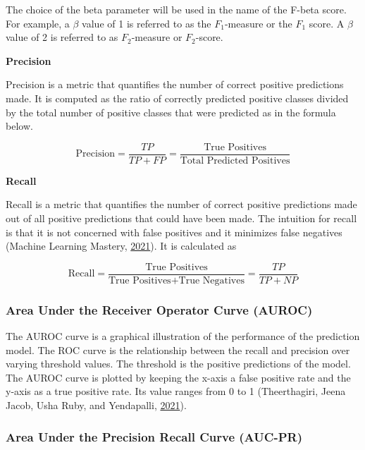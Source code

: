\documentclass[
  10pt,
]{article}
\begin{document}
The choice of the beta parameter will be used in the name of the F-beta score. For example, a \(\beta\) value of 1 is referred to as the \(F_1\)-measure or the \(F_1\) score. A \(\beta\) value of 2 is referred to as \(F_2\)-measure or \(F_2\)-score.

\textbf{Precision}

Precision is a metric that quantifies the number of correct positive predictions made. It is computed as the ratio of correctly predicted positive classes divided by the total number of positive classes that were predicted as in the formula below.

\[
\text{Precision} = \frac{TP}{TP + FP} = \frac{\text{True Positives}}{\text{Total Predicted Positives}}
\]

\textbf{Recall}

Recall is a metric that quantifies the number of correct positive predictions made out of all positive predictions that could have been made. The intuition for recall is that it is not concerned with false positives and it minimizes false negatives (Machine Learning Mastery, \protect\hyperlink{ref-MLM}{2021}). It is calculated as

\[
\text{Recall} = \frac{\text{True Positives}}{\text{True Positives} + \text{True Negatives}} = \frac{TP}{TP + NP}
\]

\hypertarget{area-under-the-receiver-operator-curve-auroc}{%
\subsubsection{Area Under the Receiver Operator Curve (AUROC)}\label{area-under-the-receiver-operator-curve-auroc}}

The AUROC curve is a graphical illustration of the performance of the prediction model. The
ROC curve is the relationship between the recall and precision over varying threshold values. The threshold is the positive predictions of the model. The AUROC curve is plotted by keeping the x-axis a false positive rate and the y-axis as a true positive rate. Its value ranges from 0 to 1 (Theerthagiri, Jeena Jacob, Usha Ruby, and Yendapalli, \protect\hyperlink{ref-theerthagiri2021prediction}{2021}).

\hypertarget{area-under-the-precision-recall-curve-auc-pr}{%
\subsubsection{Area Under the Precision Recall Curve (AUC-PR)}\label{area-under-the-precision-recall-curve-auc-pr}}
\end{document}
